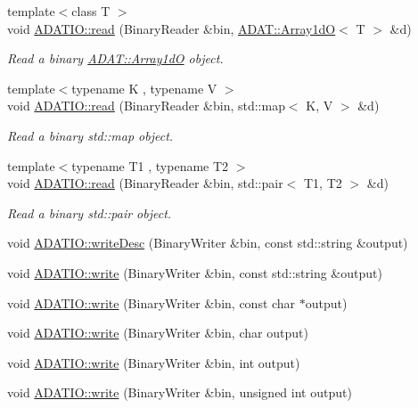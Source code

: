 \begin{DoxyCompactItemize}
{\footnotesize template$<$class T $>$ }\\void \mbox{\hyperlink{namespaceADATIO_aee4123faea4044073f3c166dab12cb9e}{A\+D\+A\+T\+I\+O\+::read}} (Binary\+Reader \&bin, \mbox{\hyperlink{classADAT_1_1Array1dO}{A\+D\+A\+T\+::\+Array1dO}}$<$ T $>$ \&d)
\begin{DoxyCompactList}\small\item\em Read a binary \mbox{\hyperlink{classADAT_1_1Array1dO}{A\+D\+A\+T\+::\+Array1dO}} object. \end{DoxyCompactList}\item 
{\footnotesize template$<$typename K , typename V $>$ }\\void \mbox{\hyperlink{namespaceADATIO_aae6ee71c391ad98e959febc86231331b}{A\+D\+A\+T\+I\+O\+::read}} (Binary\+Reader \&bin, std\+::map$<$ K, V $>$ \&d)
\begin{DoxyCompactList}\small\item\em Read a binary std\+::map object. \end{DoxyCompactList}\item 
{\footnotesize template$<$typename T1 , typename T2 $>$ }\\void \mbox{\hyperlink{namespaceADATIO_a746a6511817f141011d50005a099feec}{A\+D\+A\+T\+I\+O\+::read}} (Binary\+Reader \&bin, std\+::pair$<$ T1, T2 $>$ \&d)
\begin{DoxyCompactList}\small\item\em Read a binary std\+::pair object. \end{DoxyCompactList}\item 
void \mbox{\hyperlink{namespaceADATIO_a0faeed900aacb29febaa709323135c50}{A\+D\+A\+T\+I\+O\+::write\+Desc}} (Binary\+Writer \&bin, const std\+::string \&output)
\item 
void \mbox{\hyperlink{namespaceADATIO_a12d01adc4b592d85f0f5f5c101205c08}{A\+D\+A\+T\+I\+O\+::write}} (Binary\+Writer \&bin, const std\+::string \&output)
\item 
void \mbox{\hyperlink{namespaceADATIO_a7a53460de240b5544de0b7c60b2eb455}{A\+D\+A\+T\+I\+O\+::write}} (Binary\+Writer \&bin, const char $\ast$output)
\item 
void \mbox{\hyperlink{namespaceADATIO_a36dc30e1303b7d207fefebf8d5d5eb6e}{A\+D\+A\+T\+I\+O\+::write}} (Binary\+Writer \&bin, char output)
\item 
void \mbox{\hyperlink{namespaceADATIO_acd8820f167370337965f2788946e6cd1}{A\+D\+A\+T\+I\+O\+::write}} (Binary\+Writer \&bin, int output)
\item 
void \mbox{\hyperlink{namespaceADATIO_a4414db50c6a20ca89996529421eb8d0b}{A\+D\+A\+T\+I\+O\+::write}} (Binary\+Writer \&bin, unsigned int output)

\end{DoxyCompactItemize}
